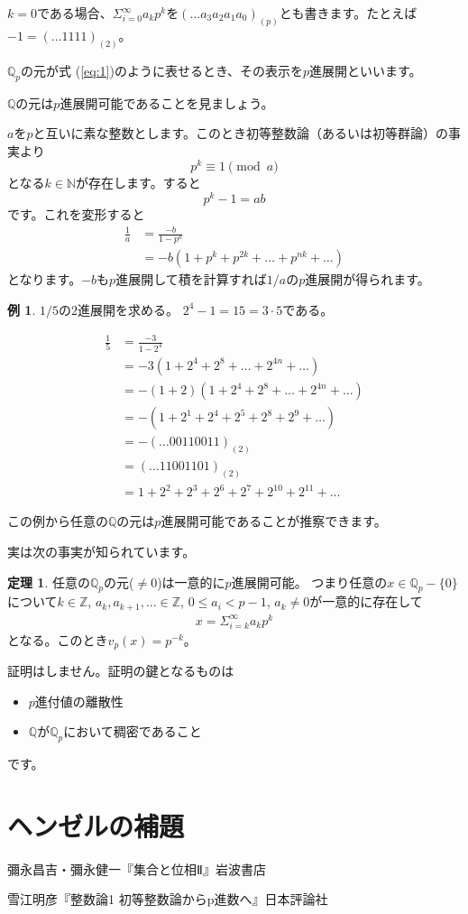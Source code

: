 \documentclass[uplatex]{jsarticle}
\newcommand{\Z}{\mathbb{Z}}
\newcommand{\Q}{\mathbb{Q}}
\theoremstyle{definition} %
\newtheorem{thm}{定理}
\newtheorem*{example*}{例}
\begin{document}
$k=0$である場合、$\Sigma_{i=0}^\infty a_k p^k$を$(\dots a_3 a_2 a_1 a_0)_{(p)}$とも書きます。たとえば $-1 = (\dots 1 1 1 1)_{(2)}$。

$\Q_p$の元が式 (\ref{eq:1})のように表せるとき、その表示を$p$進展開といいます。

$\Q$の元は$p$進展開可能であることを見ましょう。

$a$を$p$と互いに素な整数とします。このとき初等整数論（あるいは初等群論）の事実より
\[p^k \equiv 1 \pmod a\]
となる$k \in \mathbb{N}$が存在します。すると
\[p^k-1 = ab\]
です。これを変形すると
\begin{align*}
\frac{1}{a} &= \frac{-b}{1-p^k} \\
&= -b(1+p^k+p^{2k}+\dots+p^{nk}+\dots)
\end{align*}
となります。$-b$も$p$進展開して積を計算すれば$1/a$の$p$進展開が得られます。

\begin{example*}
$1/5$の$2$進展開を求める。
$2^4-1 = 15 = 3 \cdot 5$である。

\begin{align*}
\frac{1}{5} &= \frac{-3}{1-2^4} \\
&= -3 (1 + 2^4 + 2^8 + \dots+ 2^{4n} + \dots) \\
&= -(1+2) (1 + 2^4 + 2^8 + \dots+ 2^{4n} + \dots) \\
&= -(1 + 2^1 + 2^4 + 2^5 + 2^8 + 2^9 + \dots) \\
&= -(\dots 00110011)_{(2)} \\
&= (\dots 11001101)_{(2)} \\
&= 1 + 2^2 + 2^3 + 2^6 + 2^7 + 2^{10} + 2^{11} + \dots
\end{align*}
\end{example*}

この例から任意の$\Q$の元は$p$進展開可能であることが推察できます。

実は次の事実が知られています。
\begin{oframed}\begin{thm}
任意の$\Q_p$の元($\ne 0$)は一意的に$p$進展開可能。
つまり任意の$x \in \Q_p- \{0\}$について$k \in \Z$, $a_k, a_{k+1}, \dots \in \Z$, $0 \le a_i < p-1$, $a_k \ne 0$が一意的に存在して
\begin{align}
x = \Sigma_{i=k}^\infty a_k p^k \label{eq:1}
\end{align}
となる。このとき$v_p(x) = p^{-k}$。
\end{thm}\end{oframed}
証明はしません。証明の鍵となるものは
\begin{itemize}
\item $p$進付値の離散性
\item $\Q$が$\Q_p$において稠密であること
\end{itemize}
です。

\section{ヘンゼルの補題}

\begin{thebibliography}{9}
\item 彌永昌吉・彌永健一『集合と位相Ⅱ』岩波書店
\item 雪江明彦『整数論1 初等整数論からp進数へ』日本評論社
\end{thebibliography}
\end{document}

